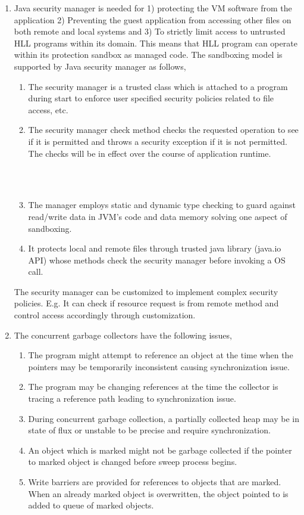 \documentclass[11pt,a4paper,oneside]{article}
\begin{document}
\begin{enumerate}
		  
		\item Java security manager is needed for 1) protecting the VM software from the application 2) Preventing the guest application from accessing other files on both remote and local systems and 3) To strictly limit access to untrusted HLL programs within its domain. This means that HLL program can operate within its protection sandbox as managed code. The sandboxing model is supported by Java security manager as follows,
			  \begin{enumerate}
			    \item The security manager is a trusted class which is attached to a program during start to enforce user specified security policies related to file access, etc.
			    \item The security manager check method checks the requested operation to see if it is permitted and throws a security exception if it is not permitted. The checks will be in effect over the course of application runtime.
			    \begin{verbatim}
			    
			    
			    \end{verbatim}
			    \item The manager employs static and dynamic type checking to guard against read/write data in JVM's code and data memory solving one aspect of sandboxing.
			    \item It protects local and remote files through trusted java library (java.io API) whose methods check the security manager before invoking a OS call.
			  \end{enumerate}
			 The security manager can be customized to implement complex security policies. E.g. It can check if resource request is from remote method and control access accordingly through customization. 
		
		\item The concurrent garbage collectors have the following issues,
			  \begin{enumerate}
				\item The program might attempt to reference an object at the time when the pointers may be temporarily inconsistent causing synchronization issue.
				\item The program may be changing references at the time the collector is tracing a reference path leading to synchronization issue.
				\item During concurrent garbage collection, a partially collected heap may be in state of flux or unstable to be precise and require synchronization.
				\item An object which is marked might not be garbage collected if the pointer to marked object is changed before sweep process begins.
				\item Write barriers are provided for references to objects that are marked. When an already marked object is overwritten, the object pointed to is added to queue of marked objects.
			  \end{enumerate}
		

\end{enumerate}
\end{document}
